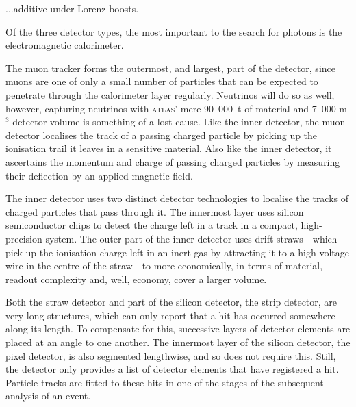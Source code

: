 ...additive under Lorenz boosts.

Of the three detector types, the most important to the search for photons is the electromagnetic calorimeter.

The muon tracker forms the outermost, and largest, part of the detector, since muons are one of only a small number of particles that can be expected to penetrate through the calorimeter layer regularly. Neutrinos will do so as well, however, capturing neutrinos with \textsc{atlas}' mere 90~000~t of material and 7~000 m$^3$ detector volume \cite{atlasweb} is something of a lost cause. Like the inner detector, the muon detector localises the track of a passing charged particle by picking up the ionisation trail it leaves in a sensitive material. Also like the inner detector, it ascertains the momentum and charge of passing charged particles by measuring their deflection by an applied magnetic field.

The inner detector uses two distinct detector technologies to localise the tracks of charged particles that pass through it. The innermost layer uses silicon semiconductor chips to detect the charge left in a track in a compact, high-precision system. The outer part of the inner detector uses drift straws---which pick up the ionisation charge left in an inert gas by attracting it to a high-voltage wire in the centre of the straw---to more economically, in terms of material, readout complexity and, well, economy, cover a larger volume.

Both the straw detector and part of the silicon detector, the strip detector, are very long structures, which can only report that a hit has occurred somewhere along its length. To compensate for this, successive layers of detector elements are placed at an angle to one another. The innermost layer of the silicon detector, the pixel detector, is also segmented lengthwise, and so does not require this. Still, the detector only provides a list of detector elements that have registered a hit. Particle tracks are fitted to these hits in one of the stages of the subsequent analysis of an event.

